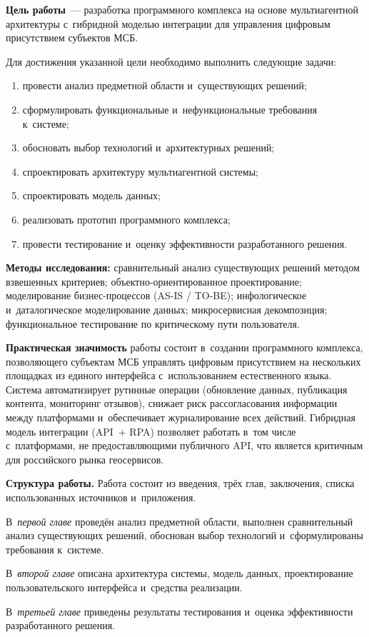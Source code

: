 \textbf{Цель работы}~--- разработка программного комплекса на основе мультиагентной архитектуры с~гибридной моделью интеграции для управления цифровым присутствием субъектов МСБ.

Для достижения указанной цели необходимо выполнить следующие задачи:

\begin{enumerate}
  \item провести анализ предметной области и~существующих решений;
  \item сформулировать функциональные и~нефункциональные требования к~системе;
  \item обосновать выбор технологий и~архитектурных решений;
  \item спроектировать архитектуру мультиагентной системы;
  \item спроектировать модель данных;
  \item реализовать прототип программного комплекса;
  \item провести тестирование и~оценку эффективности разработанного решения.
\end{enumerate}

\textbf{Методы исследования:} сравнительный анализ существующих решений методом взвешенных критериев; объектно-ориентированное проектирование; моделирование бизнес-процессов (AS-IS / TO-BE); инфологическое и~даталогическое моделирование данных; микросервисная декомпозиция; функциональное тестирование по критическому пути пользователя.

\textbf{Практическая значимость} работы состоит в~создании программного комплекса, позволяющего субъектам МСБ управлять цифровым присутствием на нескольких площадках из единого интерфейса с~использованием естественного языка. Система автоматизирует рутинные операции (обновление данных, публикация контента, мониторинг отзывов), снижает риск рассогласования информации между платформами и~обеспечивает журналирование всех действий. Гибридная модель интеграции (API~+ RPA) позволяет работать в~том числе с~платформами, не предоставляющими публичного API, что является критичным для российского рынка геосервисов.

\textbf{Структура работы.} Работа состоит из введения, трёх глав, заключения, списка использованных источников и~приложения.

В~\textit{первой главе} проведён анализ предметной области, выполнен сравнительный анализ существующих решений, обоснован выбор технологий и~сформулированы требования к~системе.

В~\textit{второй главе} описана архитектура системы, модель данных, проектирование пользовательского интерфейса и~средства реализации.

В~\textit{третьей главе} приведены результаты тестирования и~оценка эффективности разработанного решения.
